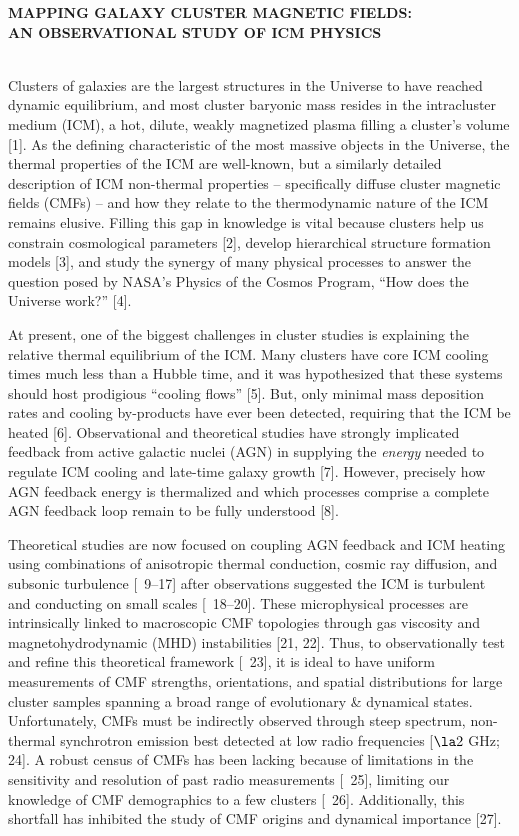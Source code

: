 \documentclass[letterpaper,12pt]{article}
\newcommand{\pcos}{posed by NASA's Physics of the Cosmos Program}
\begin{document}
\begin{center}
  {\bf\uppercase{mapping galaxy cluster magnetic fields:\\an
      observational study of icm physics}}
\end{center}

\\
\indent Clusters of galaxies are the largest structures in the
Universe to have reached dynamic equilibrium, and most cluster
baryonic mass resides in the intracluster medium (ICM), a hot, dilute,
weakly magnetized plasma filling a cluster's volume [1]. As the
defining characteristic of the most massive objects in the Universe,
the thermal properties of the ICM are well-known, but a similarly
detailed description of ICM non-thermal properties -- specifically
diffuse cluster magnetic fields (CMFs) -- and how they relate to the
thermodynamic nature of the ICM remains elusive. Filling this gap in
knowledge is vital because clusters help us constrain cosmological
parameters [2], develop hierarchical structure formation models [3],
and study the synergy of many physical processes to answer the
question \pcos, ``How does the Universe work?'' [4].

At present, one of the biggest challenges in cluster studies is
explaining the relative thermal equilibrium of the ICM. Many clusters
have core ICM cooling times much less than a Hubble time, and it was
hypothesized that these systems should host prodigious ``cooling
flows'' [5]. But, only minimal mass deposition rates and cooling
by-products have ever been detected, requiring that the ICM be heated
[6]. Observational and theoretical studies have strongly implicated
feedback from active galactic nuclei (AGN) in supplying the
{\it{energy}} needed to regulate ICM cooling and late-time galaxy
growth [7]. However, precisely how AGN feedback energy is thermalized
and which processes comprise a complete AGN feedback loop remain to be
fully understood [8].

Theoretical studies are now focused on coupling AGN feedback and ICM
heating using combinations of anisotropic thermal conduction, cosmic
ray diffusion, and subsonic turbulence [\eg\ 9--17] after observations
suggested the ICM is turbulent and conducting on small scales
[\eg\ 18--20]. These microphysical processes are intrinsically linked
to macroscopic CMF topologies through gas viscosity and
magnetohydrodynamic (MHD) instabilities [21, 22]. Thus, to
observationally test and refine this theoretical framework [\eg\ 23],
it is ideal to have uniform measurements of CMF strengths,
orientations, and spatial distributions for large cluster samples
spanning a broad range of evolutionary \& dynamical
states. Unfortunately, CMFs must be indirectly observed through steep
spectrum, non-thermal synchrotron emission best detected at low radio
frequencies [$\la 2$ GHz; 24]. A robust census of CMFs has been
lacking because of limitations in the sensitivity and resolution of
past radio measurements [\eg\ 25], limiting our knowledge of CMF
demographics to a few clusters [\eg\ 26]. Additionally, this shortfall
has inhibited the study of CMF origins and dynamical importance [27].
\end{document}

